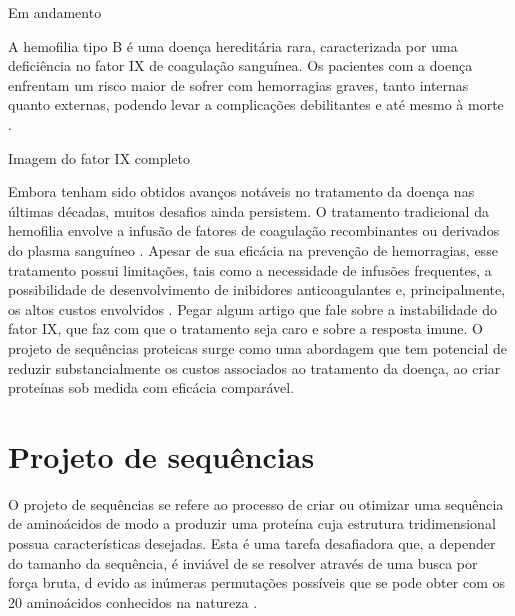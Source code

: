 

{\color{red} Em andamento}


\label{cap:introducao}
\enlargethispage{.5\baselineskip}
A hemofilia tipo B é uma doença hereditária rara, caracterizada por uma deficiência no fator IX de coagulação sanguínea. 
Os pacientes com a doença enfrentam um risco maior de sofrer com hemorragias graves, tanto internas quanto externas, 
podendo levar a complicações debilitantes e até mesmo à morte \cite{Mannucci}.

{\color{red} Imagem do fator IX completo}

Embora tenham sido obtidos avanços notáveis no tratamento da doença nas últimas décadas, muitos desafios ainda persistem. 
O tratamento tradicional da hemofilia envolve a infusão de fatores de coagulação recombinantes ou derivados do plasma sanguíneo \cite{Gouw}. 
Apesar de sua eficácia na prevenção de hemorragias, 
esse tratamento possui limitações, 
tais como a necessidade de infusões frequentes, a possibilidade de desenvolvimento de inibidores anticoagulantes e, principalmente, 
os altos custos envolvidos \cite{Mancuso}. 
{\color{red} Pegar algum artigo que fale sobre a instabilidade do fator IX, que faz com que o tratamento seja caro e sobre a resposta imune.}
O projeto de sequências proteicas surge como uma abordagem que tem potencial de reduzir substancialmente 
os custos associados ao tratamento da doença, ao criar proteínas sob medida com eficácia comparável.


\section{Projeto de sequências}

O projeto de sequências se refere ao processo de criar ou otimizar uma sequência de aminoácidos de modo a produzir uma proteína 
cuja estrutura tridimensional possua características desejadas. 
Esta é uma tarefa desafiadora que, a depender do tamanho da sequência, 
é inviável de se resolver através de uma busca por força bruta, d
evido as inúmeras permutações possíveis que se pode obter com os 20 aminoácidos conhecidos na natureza \cite{Overview}.  

